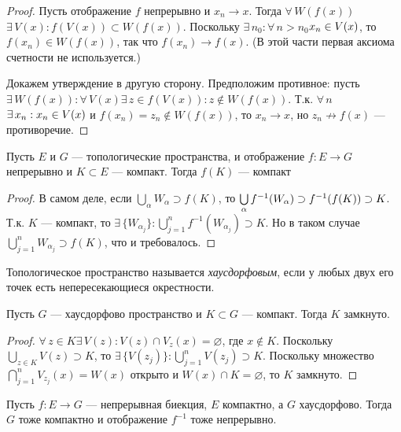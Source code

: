 \documentclass[10pt]{article}
\newcommand*{\p}[1]{#1\nobreak\discretionary{}{\hbox{$\mathsurround=0pt #1$}}{}}
\begin{document}
\begin{proof}
Пусть отображение $f$ непрерывно и $x_n\to x$. Тогда
$\forall\,W(f(x))$\;\;$\exists\, V(x):f(V(x))\subset W(f(x))$.
Поскольку $\exists\,n_0:\forall\,n>n_0$\;\;$x_n\p\in V(x)$, то
$f(x_n)\in W(f(x))$, так что $f(x_n)\to f(x)$. (В этой части первая
аксиома счетности не используется.)

Докажем утверждение в другую сторону. Предположим противное: пусть
$\exists\, W(f(x)):\forall\,V(x)$\;\;$\exists\,z\in f(V(x)):z\not\in
W(f(x))$. Т.к. $\forall\,n$\;\;$\exists\,x_n:x_n\p\in V(x)$ и
$f(x_n)=z_n\not\in W(f(x))$, то $x_n\to x$, но $z_n\nrightarrow
f(x)$ --- противоречие.
\end{proof}

\begin{prop}
Пусть $E$ и $G$ --- топологические пространства, и отображение
$f\colon E\to G$ непрерывно и $K\subset E$ --- компакт. Тогда $f(K)$
--- компакт
\end{prop}

\begin{proof}
В самом деле, если $\bigcup\limits_\alpha W_\alpha\supset f(K)$, то
$\bigcup\limits_{\alpha}f^{-1}(W_\alpha)\p\supset
f^{-1}(f(K))\supset K$. Т.к. $K$ --- компакт, то
$\exists\,\{W_{\alpha_j}\}:\bigcup\limits_{j=1}^n
f^{-1}(W_{\alpha_j})\supset K$. Но в таком случае
$\bigcup\limits_{j=1}^n W_{\alpha_j}\supset f(K)$, что и
требовалось.
\end{proof}

\begin{df}
Топологическое пространство называется \emph{хаусдорфовым}, если у
любых двух его точек есть непересекающиеся окрестности.
\end{df}

\begin{lemma}\label{lemm.hau.komp->zamk}
Пусть $G$ --- хаусдорфово пространство и $K\subset G$ --- компакт.
Тогда $K$ замкнуто.
\end{lemma}

\begin{proof}
$\forall\,z\in K$\;\;$\exists\,V(z):V(z)\cap V_z(x)=\varnothing$,
где $x\not\in K$. Поскольку $\bigcup\limits_{z\in K}V(z)\supset K$,
то $\exists\,\{V(z_j)\}:\bigcup\limits_{j=1}^n V(z_j)\supset K$.
Поскольку множество $\bigcap\limits_{j=1}^n V_{z_j}(x)=W(x)$ открыто
и $W(x)\cap K=\varnothing$, то $K$ замкнуто.
\end{proof}

\begin{prop}
Пусть $f\colon E\to G$ --- непрерывная биекция, $E$ компактно, а $G$
хаусдорфово. Тогда $G$ тоже компактно и отображение $f^{-1}$ тоже
непрерывно.
\end{prop}
\end{document}
